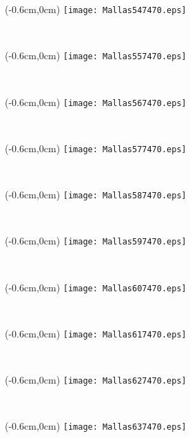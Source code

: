 \documentclass[12pt,letterpaper,oneside]{report}
\begin{document}
\begin{textblock*}{\paperwidth}(-0.6cm,0cm)
\texttt{[image: Mallas547470.eps]}
\end{textblock*}

\ \pagebreak
\begin{textblock*}{\paperwidth}(-0.6cm,0cm)
\texttt{[image: Mallas557470.eps]}
\end{textblock*}

\ \pagebreak
\begin{textblock*}{\paperwidth}(-0.6cm,0cm)
\texttt{[image: Mallas567470.eps]}
\end{textblock*}

\ \pagebreak
\begin{textblock*}{\paperwidth}(-0.6cm,0cm)
\texttt{[image: Mallas577470.eps]}
\end{textblock*}

\ \pagebreak
\begin{textblock*}{\paperwidth}(-0.6cm,0cm)
\texttt{[image: Mallas587470.eps]}
\end{textblock*}

\ \pagebreak
\begin{textblock*}{\paperwidth}(-0.6cm,0cm)
\texttt{[image: Mallas597470.eps]}
\end{textblock*}

\ \pagebreak
\begin{textblock*}{\paperwidth}(-0.6cm,0cm)
\texttt{[image: Mallas607470.eps]}
\end{textblock*}

\ \pagebreak
\begin{textblock*}{\paperwidth}(-0.6cm,0cm)
\texttt{[image: Mallas617470.eps]}
\end{textblock*}

\ \pagebreak
\begin{textblock*}{\paperwidth}(-0.6cm,0cm)
\texttt{[image: Mallas627470.eps]}
\end{textblock*}

\ \pagebreak
\begin{textblock*}{\paperwidth}(-0.6cm,0cm)
\texttt{[image: Mallas637470.eps]}
\end{textblock*}
\end{document}
